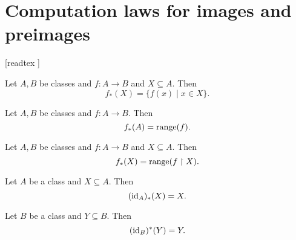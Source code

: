 \documentclass[../../set-theory/set-theory.tex]{subfiles}
\begin{document}
  \chapter{Computation laws for images and preimages}\label{chapter:image-and-preimage}


  \begin{forthel}

    [readtex ]

  \end{forthel}

  \begin{forthel}
    \begin{proposition}
      Let $A, B$ be classes and $f : A \to B$ and $X \subseteq A$.
      Then \[ f_{*}(X) = \{ f(x) \mid x \in X \}. \]
    \end{proposition}
  \end{forthel}

  \begin{forthel}
    \begin{corollary}
      Let $A, B$ be classes and $f : A \to B$.
      Then \[ f_{*}(A) = \operatorname{range}(f). \]
    \end{corollary}
  \end{forthel}

  \begin{forthel}
    \begin{corollary}
      Let $A, B$ be classes and $f : A \to B$ and $X \subseteq A$.
      Then \[ f_{*}(X) = \operatorname{range}(f \restriction X). \]
    \end{corollary}
  \end{forthel}

  \begin{forthel}
    \begin{proposition}
      Let $A$ be a class and $X \subseteq A$.
      Then \[ (\operatorname{id}_{A})_{*}(X) = X. \]
    \end{proposition}
  \end{forthel}

  \begin{forthel}
    \begin{proposition}
      Let $B$ be a class and $Y \subseteq B$.
      Then \[ (\operatorname{id}_{B})^{*}(Y) = Y. \]
    \end{proposition}
  \end{forthel}
\end{document}
